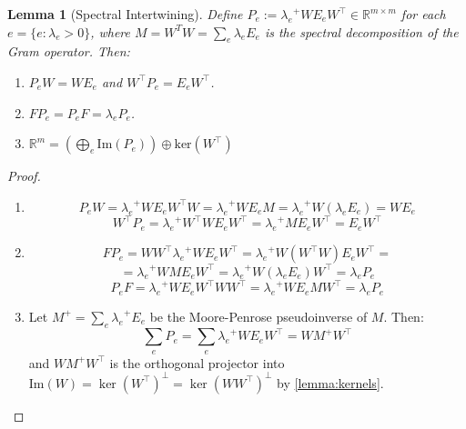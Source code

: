 \documentclass{article}
\theoremstyle{plain}
\newtheorem{lemma}{Lemma}[section]
\numberwithin{equation}{section}
\theoremstyle{definition}
\theoremstyle{remark}
\begin{document}
\begin{lemmaproofbox}
    \begin{lemma}[Spectral Intertwining]\label{lemma:spectral_intertwining} Define $P_e:={\lambda_e}^{+}WE_eW^\top \in \mathbb{R}^{m\times m}$ for each $e = \{e: \lambda_e>0\}$, where $M = W^TW = \sum_{e}\lambda_e E_e$ is the spectral decomposition of the Gram operator. Then:
        \begin{enumerate}[label=(\roman*)]
            \item $P_eW = WE_e$ and $W^\top P_e = E_e W^\top$. 
            \item $FP_e = P_eF = \lambda_eP_e$. 
            \item $\mathbb{R}^m = \left(\bigoplus_{e}\text{Im}(P_e)\right)\oplus \text{ker}(W^\top)$
         \end{enumerate}
    \end{lemma}
    \begin{proof}
        \begin{enumerate}[label=(\roman*)]
            \item $$P_eW = {\lambda_e}^{+}WE_e W^\top W = {\lambda_e}^{+}WE_e M = {\lambda_e}^{+}W(\lambda_e E_e) = WE_e$$
            $$W^\top P_e =  {\lambda_e}^{+}W^\top WE_eW^\top = {\lambda_e}^{+}ME_eW^\top = E_eW^\top $$
            \item $$FP_e = WW^\top {\lambda_e}^{+}WE_eW^\top = {\lambda_e}^{+} W(W^\top W)E_e W^\top =$$
            $$= {\lambda_e}^{+}WME_eW^\top = {\lambda_e}^{+}W(\lambda_eE_e)W^\top = \lambda_eP_e$$
	   $$P_eF = {\lambda_e}^{+}WE_eW^\top WW^\top  = {\lambda_e}^{+}WE_eMW^\top  = \lambda_eP_e$$
            \item Let $M^+ = \sum_{e}{\lambda_e}^{+}E_e$ be the Moore-Penrose pseudoinverse of $M$. Then: $$\sum_{e}P_e = \sum_{e}{\lambda_e}^{+} WE_e W^\top = WM^+ W^\top$$
   and $WM^+W^\top$ is the orthogonal projector into $\text{Im}(W) = \ker(W^\top) ^\perp = \ker(WW^\top)^\perp$ by \ref{lemma:kernels}. 
         \end{enumerate}
    \end{proof}
\end{lemmaproofbox}
\end{document}
